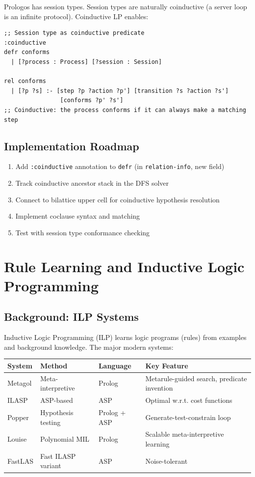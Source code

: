 \documentclass[11pt]{article}
\begin{document}
Prologos has session types. Session types are naturally coinductive (a server
loop is an infinite protocol). Coinductive LP enables:

\begin{verbatim}
;; Session type as coinductive predicate
:coinductive
defr conforms
  | [?process : Process] [?session : Session]

rel conforms
  | [?p ?s] :- [step ?p ?action ?p'] [transition ?s ?action ?s']
                [conforms ?p' ?s']
;; Coinductive: the process conforms if it can always make a matching step
\end{verbatim}
\subsection{Implementation Roadmap}
\label{sec:orgf5052c0}

\begin{enumerate}
\item Add \texttt{:coinductive} annotation to \texttt{defr} (in \texttt{relation-info}, new field)
\item Track coinductive ancestor stack in the DFS solver
\item Connect to bilattice upper cell for coinductive hypothesis resolution
\item Implement coclause syntax and matching
\item Test with session type conformance checking
\end{enumerate}
\section{Rule Learning and Inductive Logic Programming}
\label{sec:orgf2296af}

\subsection{Background: ILP Systems}
\label{sec:org0b9bc2e}

Inductive Logic Programming (ILP) learns logic programs (rules) from examples
and background knowledge. The major modern systems:

\begin{center}
\begin{tabular}{llll}
System & Method & Language & Key Feature\\
\hline
Metagol & Meta-interpretive & Prolog & Metarule-guided search, predicate invention\\
ILASP & ASP-based & ASP & Optimal w.r.t. cost functions\\
Popper & Hypothesis testing & Prolog + ASP & Generate-test-constrain loop\\
Louise & Polynomial MIL & Prolog & Scalable meta-interpretive learning\\
FastLAS & Fast ILASP variant & ASP & Noise-tolerant\\
\end{tabular}
\end{center}
\end{document}
